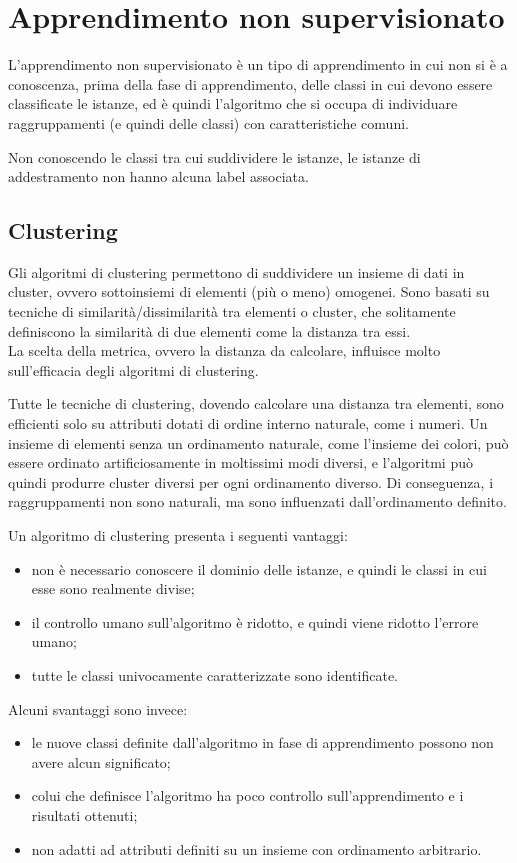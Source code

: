 \chapter{Apprendimento non supervisionato}
L'apprendimento non supervisionato è un tipo di apprendimento in cui non si è a conoscenza, prima della fase di apprendimento, delle classi in cui devono essere classificate le istanze, ed è quindi l'algoritmo che si occupa di individuare raggruppamenti (e quindi delle classi) con caratteristiche comuni.

Non conoscendo le classi tra cui suddividere le istanze, le istanze di addestramento non hanno alcuna label associata.



\section{Clustering}
Gli algoritmi di clustering permettono di suddividere un insieme di dati in cluster, ovvero sottoinsiemi di elementi (più o meno) omogenei.
Sono basati su tecniche di similarità/dissimilarità tra elementi o cluster, che solitamente definiscono la similarità di due elementi come la distanza tra essi. \\
La scelta della metrica, ovvero la distanza da calcolare, influisce molto sull'efficacia degli algoritmi di clustering.

Tutte le tecniche di clustering, dovendo calcolare una distanza tra elementi, sono efficienti solo su attributi dotati di ordine interno naturale, come i numeri.
Un insieme di elementi senza un ordinamento naturale, come l'insieme dei colori, può essere ordinato artificiosamente in moltissimi modi diversi, e l'algoritmi può quindi produrre cluster diversi per ogni ordinamento diverso. Di conseguenza, i raggruppamenti non sono naturali, ma sono influenzati dall'ordinamento definito.

Un algoritmo di clustering presenta i seguenti vantaggi:
\begin{itemize}
    \item non è necessario conoscere il dominio delle istanze, e quindi le classi in cui esse sono realmente divise;
    \item il controllo umano sull'algoritmo è ridotto, e quindi viene ridotto l'errore umano;
    \item tutte le classi univocamente caratterizzate sono identificate.
\end{itemize}
Alcuni svantaggi sono invece:
\begin{itemize}
    \item le nuove classi definite dall'algoritmo in fase di apprendimento possono non avere alcun significato;
    \item colui che definisce l'algoritmo ha poco controllo sull'apprendimento e i risultati ottenuti;
    \item non adatti ad attributi definiti su un insieme con ordinamento arbitrario.
\end{itemize}

